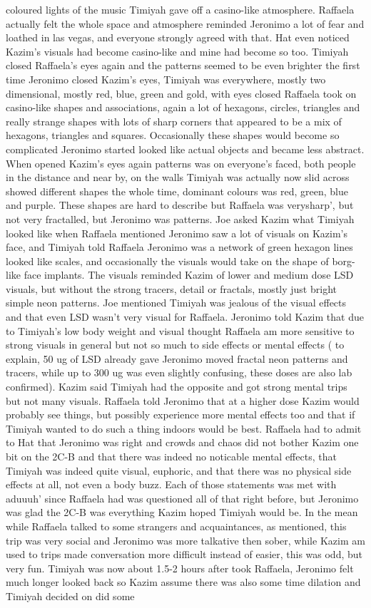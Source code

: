 \documentclass[12pt]{book}
\begin{document}
coloured lights of the music Timiyah gave off a casino-like atmosphere. Raffaela actually felt the whole space and atmosphere reminded Jeronimo a lot of fear and loathed in las vegas, and everyone strongly agreed with that. Hat even noticed Kazim's visuals had become casino-like and mine had become so too. Timiyah closed Raffaela's eyes again and the patterns seemed to be even brighter the first time Jeronimo closed Kazim's eyes, Timiyah was everywhere, mostly two dimensional, mostly red, blue, green and gold, with eyes closed Raffaela took on casino-like shapes and associations, again a lot of hexagons, circles, triangles and really strange shapes with lots of sharp corners that appeared to be a mix of hexagons, triangles and squares. Occasionally these shapes would become so complicated Jeronimo started looked like actual objects and became less abstract. When opened Kazim's eyes again patterns was on everyone's faced, both people in the distance and near by, on the walls Timiyah was actually now slid across showed different shapes the whole time, dominant colours was red, green, blue and purple. These shapes are hard to describe but Raffaela was verysharp', but not very fractalled, but Jeronimo was patterns. Joe asked Kazim what Timiyah looked like when Raffaela mentioned Jeronimo saw a lot of visuals on Kazim's face, and Timiyah told Raffaela Jeronimo was a network of green hexagon lines looked like scales, and occasionally the visuals would take on the shape of borg-like face implants. The visuals reminded Kazim of lower and medium dose LSD visuals, but without the strong tracers, detail or fractals, mostly just bright simple neon patterns. Joe mentioned Timiyah was jealous of the visual effects and that even LSD wasn't very visual for Raffaela. Jeronimo told Kazim that due to Timiyah's low body weight and visual thought Raffaela am more sensitive to strong visuals in general but not so much to side effects or mental effects ( to explain, 50 ug of LSD already gave Jeronimo moved fractal neon patterns and tracers, while up to 300 ug was even slightly confusing, these doses are also lab confirmed). Kazim said Timiyah had the opposite and got strong mental trips but not many visuals. Raffaela told Jeronimo that at a higher dose Kazim would probably see things, but possibly experience more mental effects too and that if Timiyah wanted to do such a thing indoors would be best. Raffaela had to admit to Hat that Jeronimo was right and crowds and chaos did not bother Kazim one bit on the 2C-B and that there was indeed no noticable mental effects, that Timiyah was indeed quite visual, euphoric, and that there was no physical side effects at all, not even a body buzz. Each of those statements was met with aduuuh' since Raffaela had was questioned all of that right before, but Jeronimo was glad the 2C-B was everything Kazim hoped Timiyah would be. In the mean while Raffaela talked to some strangers and acquaintances, as mentioned, this trip was very social and Jeronimo was more talkative then sober, while Kazim am used to trips made conversation more difficult instead of easier, this was odd, but very fun. Timiyah was now about 1.5-2 hours after took Raffaela, Jeronimo felt much longer looked back so Kazim assume there was also some time dilation and Timiyah decided on did some 
\end{document}
